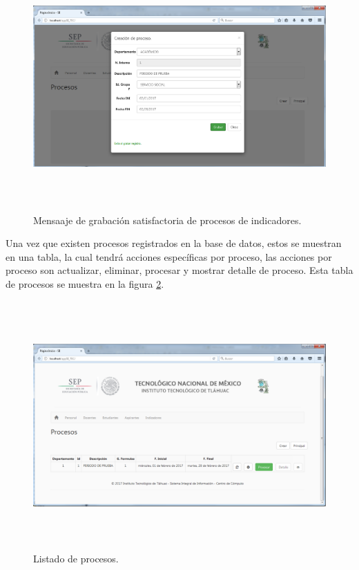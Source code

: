 		    \begin{figure}[]
		        \centering
		        \includegraphics[width=16cm, height=9.5cm]{figuras/ProcesoGraba}
		        \caption{Mensaaje de grabaci\'on satisfactoria de procesos de indicadores.}
		        \label{img_ProcesoGraba}
		    \end{figure}

		    Una vez que existen procesos registrados en la base de datos, estos se muestran en una tabla, la cual tendr\'a acciones espec\'ificas por proceso, las acciones por proceso son actualizar, eliminar, procesar y mostrar detalle de proceso. Esta tabla de procesos se muestra en la figura \ref{fig_ProcesoTabla}.\\

		    \begin{figure}[]
		        \centering
		        \includegraphics[width=16cm, height=9.5cm]{figuras/ProcesoTabla}
		        \caption{Listado de procesos.}
		        \label{fig_ProcesoTabla}
		    \end{figure}
			
